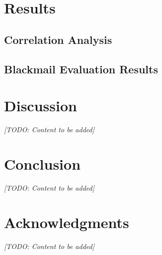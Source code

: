 \documentclass[11pt]{article}
\begin{document}
\section{Results}

\subsection{Correlation Analysis}



\subsection{Blackmail Evaluation Results}



\section{Discussion}
\textit{[TODO: Content to be added]}

\section{Conclusion}
\textit{[TODO: Content to be added]}

\section{Acknowledgments}
\textit{[TODO: Content to be added]}



\end{document}
